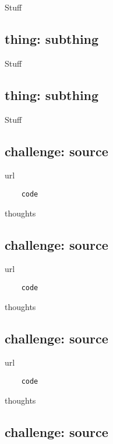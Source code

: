 \documentclass[
	letterpaper, %
	12pt, %
]{CSSullivanBusinessReport}
\begin{document}
Stuff


\subsection[thing]{thing: subthing}

Stuff


\subsection[thing]{thing: subthing}

Stuff



\subsection[Challenge]{challenge: source}

url

\begin{verbatim}
	code
\end{verbatim}

thoughts


\subsection[Challenge]{challenge: source}

url

\begin{verbatim}
	code
\end{verbatim}

thoughts


\subsection[Challenge]{challenge: source}

url

\begin{verbatim}
	code
\end{verbatim}

thoughts


\subsection[Challenge]{challenge: source}
\end{document}
